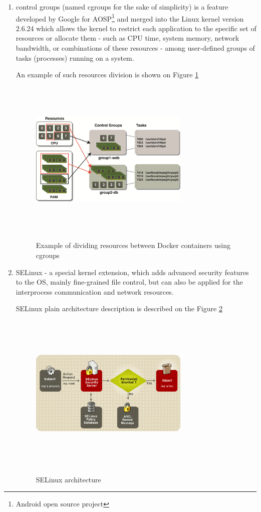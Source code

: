 \begin{enumerate}
\item control groups (named cgroups for the sake of simplicity) is
a feature developed by Google
for AOSP\footnote{Android open source project} and merged
into the Linux kernel version 2.6.24\cite{CGroupsMerged}
which allows the kernel to restrict
each application to the specific set of resources or allocate them -
such as CPU time, system memory, network bandwidth,
or combinations of these resources - among user-defined groups
of tasks (processes) running on a system.\cite{CGroupsDefinition}

An example of such resources division is
shown on Figure \ref{fig:DockerCGroupsPic}

\begin{figure}
\includegraphics[height=3in, width=3in]{dockerCGroups}
\caption{Example of dividing resources between Docker containers using cgroups}
\cite{DockerCGroupsPic}
\label{fig:DockerCGroupsPic}
\end{figure}

\item SELinux - a special kernel extension, which adds advanced security features to
the OS, mainly fine-grained file control, but can also be applied
for the interprocess communication and network resources. \cite{SELinuxDef}

SELinux plain architecture description is
described on the Figure \ref{fig:DockerSELinuxPic}

\begin{figure}
\includegraphics[height=3in, width=3in]{SELinux}
\caption{SELinux architecture}
\cite{DockerSELinuxPic}
\label{fig:DockerSELinuxPic}
\end{figure}


\end{enumerate}
